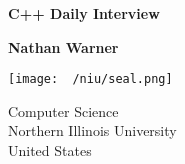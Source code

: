 \documentclass{report}
\title{\Huge{}}
\author{\huge{Nathan Warner}}
\date{\huge{}}
\begin{document}
        \begin{titlepage}
       \begin{center}
           \vspace*{1cm}
    
           \textbf{C++ Daily Interview}
    
           \vspace{0.5cm}
            
                
           \vspace{1.5cm}
    
           \textbf{Nathan Warner}
    
           \vfill
                
                
           \vspace{0.8cm}
         
           \texttt{[image: ~/niu/seal.png]}
                
           Computer Science \\
           Northern Illinois University\\
           United States\\
           
                
       \end{center}
    \end{titlepage}
    \tableofcontents
    \pagebreak 
    \bigbreak \noindent 
\end{document}
